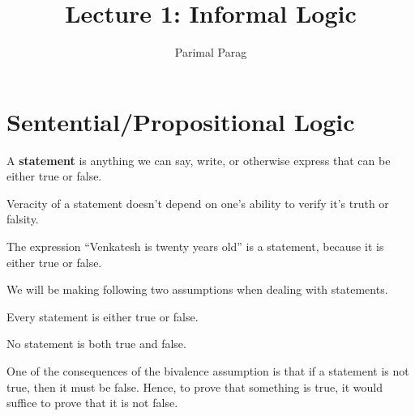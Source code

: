 \documentclass[a4paper,english,12pt]{article}
\title{Lecture 1: Informal Logic}
\author{Parimal Parag}
\begin{document}
\maketitle

\section{Sentential/Propositional Logic}
\begin{defn}[Statement] A \textbf{statement} is anything we can say, write, or otherwise express that can be either true or false. 
\end{defn}
\begin{rem} Veracity of a statement doesn't depend on one's ability to verify it's truth or falsity.
\end{rem}
\begin{exmp}
The expression ``Venkatesh is twenty years old'' is a statement, because it is either true or false.
\end{exmp}
We will be making following two assumptions when dealing with statements.
\begin{assum}[Bivalence] Every statement is either true or false.
\end{assum}
\begin{assum} No statement is both true and false.
\end{assum}
One of the consequences of the bivalence assumption is that if a statement is not true, then it must be false. Hence, to prove that something is true, it would suffice to prove that it is not false.
\end{document}
